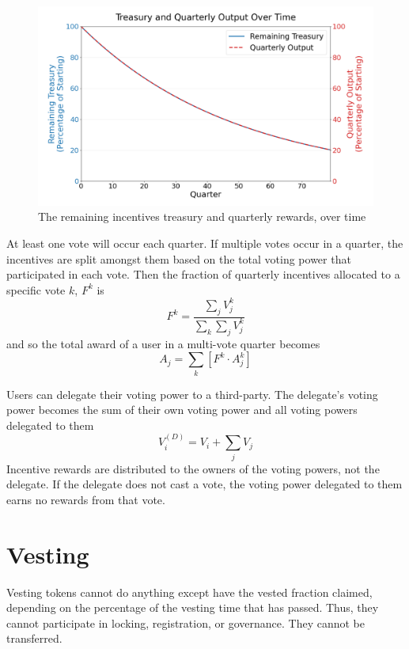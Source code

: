 \documentclass{article}
\begin{document}
\begin{figure}[h]
    \centering
    \includegraphics[width=\textwidth]{incentives-treasury-over-time.png}
    \caption{The remaining incentives treasury and quarterly rewards, over time}
    \label{fig:incentives}
\end{figure}

At least one vote will occur each quarter.
If multiple votes occur in a quarter, the incentives are split amongst them based on the total voting power that participated in each vote.
Then the fraction of quarterly incentives allocated to a specific vote $k$, $F^{k}$ is
\begin{equation}
F^{k} = \frac{\sum_j V^{k}_j}{\sum_k \sum_j V^{k}_j}
\end{equation}
and so the total award of a user in a multi-vote quarter becomes
\begin{equation}
A_j = \sum_k \left[F^{k} \cdot A^{k}_j\right]
\end{equation}

Users can delegate their voting power to a third-party.
The delegate's voting power becomes the sum of their own voting power and all voting powers delegated to them
\begin{equation}
V^{(D)}_i = V_i + \sum_j V_j
\end{equation}
Incentive rewards are distributed to the owners of the voting powers, not the delegate.
If the delegate does not cast a vote, the voting power delegated to them earns no rewards from that vote.

\section{Vesting}\label{sec:vesting}

Vesting tokens cannot do anything except have the vested fraction claimed, depending on the percentage of the vesting time that has passed.
Thus, they cannot participate in locking, registration, or governance.
They cannot be transferred.
\end{document}
